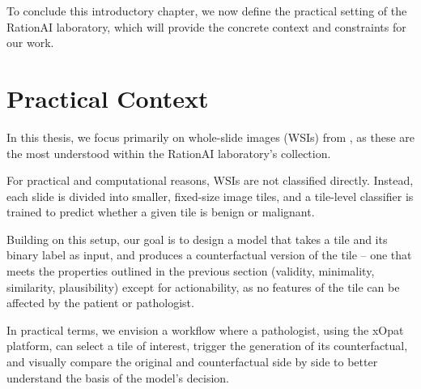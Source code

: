 To conclude this introductory chapter,
we now define the practical setting of the RationAI laboratory,
which will provide the concrete context and constraints for our work.

\section{Practical Context}

In this thesis, we focus primarily on whole-slide images (WSIs) from \dataset,
as these are the most understood within the RationAI laboratory's collection.

For practical and computational reasons, WSIs are not classified directly.
Instead, each slide is divided into smaller, fixed-size image tiles,
and a tile-level classifier is trained to predict whether a given tile is benign or malignant.

Building on this setup, our goal is to design a model that
takes a tile and its binary label as input,
and produces a counterfactual version of the tile -- one that meets the properties outlined in the previous section
(validity, minimality, similarity, plausibility) except for actionability,
as no features of the tile can be affected by the patient or pathologist.

In practical terms, we envision a workflow where a pathologist,
using the xOpat platform, can select a tile of interest,
trigger the generation of its counterfactual,
and visually compare the original and counterfactual side by side
to better understand the basis of the model's decision.
